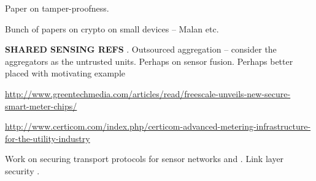 Paper on tamper-proofness.

Bunch of papers on crypto on small devices -- Malan etc.

\textbf{SHARED SENSING REFS} \cite{grosky2007}. Outsourced aggregation \cite{nath2009} -- consider the aggregators as the untrusted units. Perhaps \cite{hammad2003} on sensor fusion. Perhaps better placed with motivating example

\url{http://www.greentechmedia.com/articles/read/freescale-unveils-new-secure-smart-meter-chips/}

\url{http://www.certicom.com/index.php/certicom-advanced-metering-infrastructure-for-the-utility-industry}

Work on securing transport protocols for sensor networks  and . Link layer security \cite{karlof2004}.




